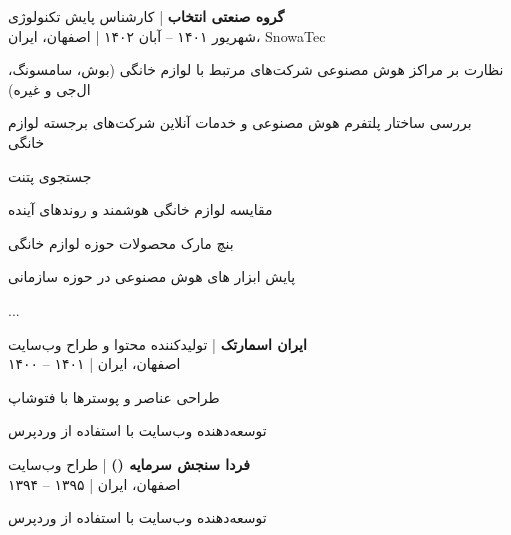 \documentclass[a4paper]{deedy-persian} %
\begin{document}
\begin{minipage}[t]{0.62\textwidth}
\textbf{گروه صنعتی انتخاب} | کارشناس پایش تکنولوژی \\
\vspace{\itemsep} %
شهریور ۱۴۰۱ – آبان ۱۴۰۲ | اصفهان، ایران، SnowaTec
\vspace{\itemsep} %
\begin{tightitemize}
\item نظارت بر مراکز هوش مصنوعی شرکت‌های مرتبط با لوازم خانگی (بوش، سامسونگ، ال‌جی و غیره)
\item بررسی ساختار پلتفرم هوش مصنوعی و خدمات آنلاین شرکت‌های برجسته لوازم خانگی
\item جستجوی پتنت
\item مقایسه لوازم خانگی هوشمند و روندهای آینده
\item بنچ مارک محصولات حوزه لوازم خانگی
\item پایش ابزار های هوش مصنوعی در حوزه سازمانی
\item ...
\end{tightitemize}
\vspace{\topsep} %

\textbf{ایران اسمارتک} | تولیدکننده محتوا و طراح وب‌سایت \\
\vspace{\itemsep} %
۱۴۰۰ – ۱۴۰۱ | اصفهان، ایران
\vspace{\itemsep} %
\begin{tightitemize}
\item طراحی عناصر و پوسترها با فتوشاپ
\item توسعه‌دهنده وب‌سایت با استفاده از وردپرس
\end{tightitemize}
\vspace{\topsep} %

\textbf{فردا سنجش سرمایه ()} | طراح وب‌سایت \\
\vspace{\itemsep} 
۱۳۹۴ – ۱۳۹۵ | اصفهان، ایران
\vspace{\itemsep} %
\begin{tightitemize}
\item توسعه‌دهنده وب‌سایت با استفاده از وردپرس
\end{tightitemize}
\vspace{\topsep} %

\end{minipage} %
\hfill
\end{document}

